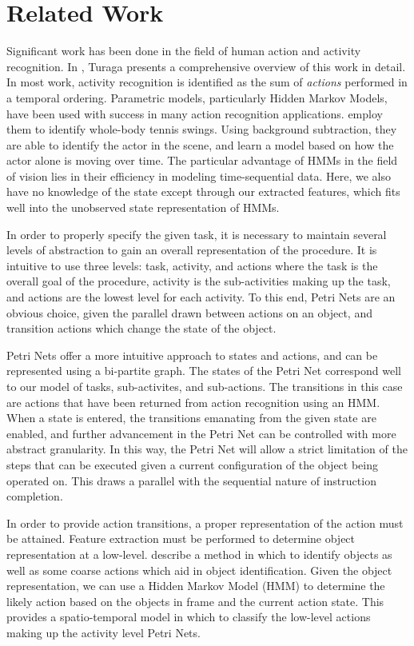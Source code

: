 \documentclass[10pt,letterpaper]{article}
\begin{document}
\section{Related Work}

Significant work has been done in the field of human action and activity recognition. In \cite{turaga2008machine}, Turaga presents a comprehensive overview of this work in detail. In most work, activity recognition is identified as the sum of \emph{actions} performed in a temporal ordering. Parametric models, particularly Hidden Markov Models, have been used with success in many action recognition applications. \cite{yamato1992recognizing} employ them to identify whole-body tennis swings. Using background subtraction, they are able to identify the actor in the scene, and learn a model based on how the actor alone is moving over time. The particular advantage of HMMs in the field of vision lies in their efficiency in modeling time-sequential data. Here, we also have no knowledge of the state except through our extracted features, which fits well into the unobserved state representation of HMMs.
	
In order to properly specify the given task, it is necessary to maintain several levels of abstraction to gain an overall representation of the procedure. It is intuitive to use three levels: task, activity, and actions where the task is the overall goal of the procedure, activity is the sub-activities making up the task, and actions are the lowest level for each activity. To this end, Petri Nets\cite{petri1966communication} are an obvious choice, given the parallel drawn between actions on an object, and transition actions which change the state of the object. 

Petri Nets offer a more intuitive approach to states and actions, and can be represented using a bi-partite graph\cite{turaga2008machine}. The states of the Petri Net correspond well to our model of tasks, sub-activites, and sub-actions. The transitions in this case are actions that have been returned from action recognition using an HMM. When a state is entered, the transitions emanating from the given state are enabled, and further advancement in the Petri Net can be controlled with more abstract granularity. In this way, the Petri Net will allow a strict limitation of the steps that can be executed given a current configuration of the object being operated on. This draws a parallel with the sequential nature of instruction completion.

In order to provide action transitions, a proper representation of the action must be attained. Feature extraction must be performed to determine object representation at a low-level. \cite{fathi2011understanding} describe a method in which to identify objects as well as some coarse actions which aid in object identification. Given the object representation, we can use a Hidden Markov Model (HMM) to determine the likely action based on the objects in frame and the current action state. This provides a spatio-temporal model in which to classify the low-level actions making up the activity level Petri Nets.
\end{document}
